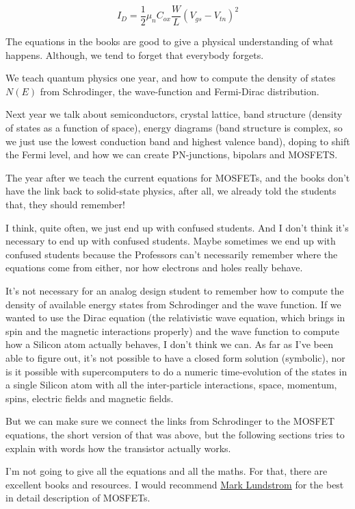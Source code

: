 \[ I_D = \frac{1}{2} \mu_n C_{ox}\frac{W}{L}(V_{gs}-V_{tn})^2 \]

The equations in the books are good to give a physical understanding of
what happens. Although, we tend to forget that everybody forgets.

We teach quantum physics one year, and how to compute the density of
states \(N(E)\) from Schrodinger, the wave-function and Fermi-Dirac
distribution.

Next year we talk about semiconductors, crystal lattice, band structure
(density of states as a function of space), energy diagrams (band
structure is complex, so we just use the lowest conduction band and
highest valence band), doping to shift the Fermi level, and how we can
create PN-junctions, bipolars and MOSFETS.

The year after we teach the current equations for MOSFETs, and the books
don't have the link back to solid-state physics, after all, we already
told the students that, they should remember!

I think, quite often, we just end up with confused students. And I don't
think it's necessary to end up with confused students. Maybe sometimes
we end up with confused students because the Professors can't
necessarily remember where the equations come from either, nor how
electrons and holes really behave.

It's not necessary for an analog design student to remember how to
compute the density of available energy states from Schrodinger and the
wave function. If we wanted to use the Dirac equation (the relativistic
wave equation, which brings in spin and the magnetic interactions
properly) and the wave function to compute how a Silicon atom actually
behaves, I don't think we can. As far as I've been able to figure out,
it's not possible to have a closed form solution (symbolic), nor is it
possible with supercomputers to do a numeric time-evolution of the
states in a single Silicon atom with all the inter-particle
interactions, space, momentum, spins, electric fields and magnetic
fields.

But we can make sure we connect the links from Schrodinger to the MOSFET
equations, the short version of that was above, but the following
sections tries to explain with words how the transistor actually works.

I'm not going to give all the equations and all the maths. For that,
there are excellent books and resources. I would recommend
\href{https://www.youtube.com/watch?v=5eG6CvcEHJ8&list=PLtkeUZItwHK6F4a4OpCOaKXKmYBKGWcHi}{Mark
Lundstrom} for the best in detail description of MOSFETs.

